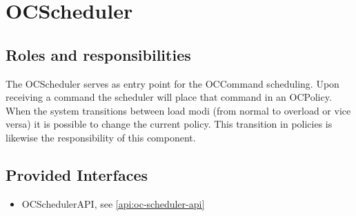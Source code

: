 \section{OCScheduler}
\label{element:oc-scheduler}

\subsection{Roles and responsibilities}

\npar The OCScheduler serves as entry point for the OCCommand scheduling. Upon
receiving a command the scheduler will place that command in an
OCPolicy. When the system transitions between load modi (from normal
to overload or vice versa) it is possible to change the current policy.
This transition in policies is likewise the responsibility of this component.

\subsection{Provided Interfaces}

\begin{itemize}
    \item OCSchedulerAPI, see \ref{api:oc-scheduler-api}
\end{itemize}